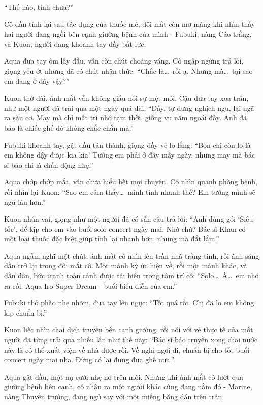 \documentclass[../main.tex]{subfiles}
\begin{document}
``Thế nào, tỉnh chưa?''

Cô dần tỉnh lại sau tác dụng của thuốc mê, đôi mắt còn mơ màng khi nhìn thấy hai người đang ngồi bên cạnh giường bệnh của mình - Fubuki, nàng Cáo trắng, và Kuon, người đang khoanh tay đầy bất lực.

Aqua đưa tay ôm lấy đầu, vẫn còn chút choáng váng. Cô ngập ngừng trả lời, giọng yếu ớt nhưng đã có chút nhận thức: ``Chắc là\dots\ rồi ạ. Nhưng mà\dots\ tại sao em đang ở đây vậy?''

Kuon thở dài, ánh mắt vẫn không giấu nổi sự mệt mỏi. Cậu đưa tay xoa trán, như một người đã trải qua một ngày quá dài: ``Đấy, tự dưng nghịch ngu, lại ngã ra sàn cơ. May mà chỉ mất trí nhớ tạm thời, giống vụ năm ngoái đấy. Anh đã bảo là chiếc ghế đó không chắc chắn mà.''

Fubuki khoanh tay, gật đầu tán thành, giọng đầy vẻ lo lắng: ``Bọn chị còn lo là em không dậy được kia kìa! Tưởng em phải ở đây mấy ngày, nhưng may mà bác sĩ bảo chỉ là chấn động nhẹ.''

Aqua chớp chớp mắt, vẫn chưa hiểu hết mọi chuyện. Cô nhìn quanh phòng bệnh, rồi nhìn lại Kuon: ``Sao em cảm thấy\dots\ mình tỉnh nhanh thế? Em tưởng mình sẽ ngủ lâu hơn.''

Kuon nhún vai, giọng như một người đã có sẵn câu trả lời: ``Anh dùng gói `Siêu tốc', để kịp cho em vào buổi solo concert ngày mai. Nhớ chứ? Bác sĩ Khan có một loại thuốc đặc biệt giúp tỉnh lại nhanh hơn, nhưng mà đắt lắm.''

Aqua ngẫm nghĩ một chút, ánh mắt cô nhìn lên trần nhà trắng tinh, rồi ánh sáng dần trở lại trong đôi mắt cô. Một mảnh ký ức hiện về, rồi một mảnh khác, và dần dần, bức tranh toàn cảnh được tái hiện trong tâm trí cô: ``Solo\dots\ À\dots\ em nhớ ra rồi. Aqua Iro Super Dream - buổi biểu diễn của em.''

Fubuki thở phào nhẹ nhõm, đưa tay lên ngực: ``Tốt quá rồi. Chị đã lo em không kịp chuẩn bị.''

Kuon liếc nhìn chai dịch truyền bên cạnh giường, rồi nói với vẻ thực tế của một người đã từng trải qua nhiều lần như thế này: ``Bác sĩ bảo truyền xong chai nước này là có thể xuất viện về nhà được rồi. Về nghỉ ngơi đi, chuẩn bị cho tốt buổi concert ngày mai nha. Đừng có lại đung đưa ghế nữa.''

Aqua gật đầu, một nụ cười nhẹ nở trên môi. Nhưng khi ánh mắt cô lướt qua giường bệnh bên cạnh, cô nhận ra một người khác cũng đang nằm đó - Marine, nàng Thuyền trưởng, đang ngủ say với một miếng băng dán trên trán.
\end{document}
